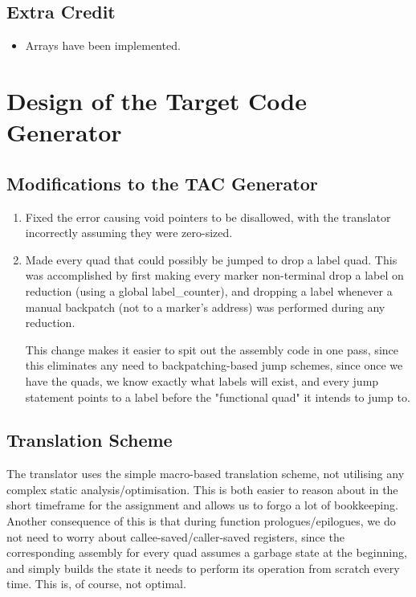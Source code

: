 \documentclass{article}
\begin{document}
\subsection{Extra Credit}
\begin{itemize}
	\item Arrays have been implemented.
\end{itemize}

\section{Design of the Target Code Generator}
\subsection{Modifications to the TAC Generator}{
	\begin{enumerate}
		\item Fixed the error causing void pointers to be disallowed, with the translator incorrectly assuming they were zero-sized.
		\item Made every quad that could possibly be jumped to drop a label quad. This was accomplished by first making every marker non-terminal drop a label on reduction (using a global label\_counter), and dropping a label whenever a manual backpatch (not to a marker's address) was performed during any reduction.\bigskip
		
		This change makes it easier to spit out the assembly code in one pass, since this eliminates any need to backpatching-based jump schemes, since once we have the quads, we know exactly what labels will exist, and every jump statement points to a label before the "functional quad" it intends to jump to.
	\end{enumerate}	
}

\subsection{Translation Scheme}{
	The translator uses the simple macro-based translation scheme, not utilising any complex static analysis/optimisation. This is both easier to reason about in the short timeframe for the assignment and allows us to forgo a lot of bookkeeping. Another consequence of this is that during function prologues/epilogues, we do not need to worry about callee-saved/caller-saved registers, since the corresponding assembly for every quad assumes a garbage state at the beginning, and simply builds the state it needs to perform its operation from scratch every time. This is, of course, not optimal.
}
\end{document}
